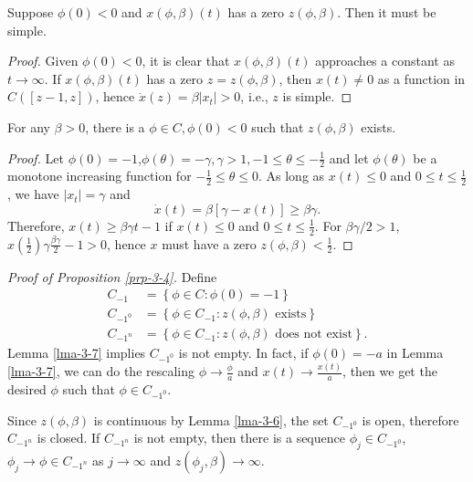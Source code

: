 \begin{lemma}\label{lma-3-6}
  Suppose $\phi(0)<0$ and $x(\phi,\beta)(t)$ has a zero $z(\phi,\beta)$. Then it must be simple.
\end{lemma}
\begin{proof}
  Given $\phi(0)<0$, it is clear that $x(\phi,\beta)(t)$ approaches a constant as $t\to \infty$. If $x(\phi,\beta)(t)$ has a zero $z=z(\phi,\beta)$, then $x(t)\neq 0$ as a function in $C\left( [z-1,z] \right) $, hence $\dot{x}(z)=\beta |x_t|>0$, i.e., $z$ is simple. 
\end{proof}

\begin{lemma}\label{lma-3-7}
  For any $\beta>0$, there is a  $\phi \in C,\phi(0)<0$ such that $z(\phi,\beta)$ exists.
\end{lemma}
\begin{proof}
  Let $\phi(0)=-1$,$ \phi(\theta)=-\gamma,\gamma>1,-1\le \theta \le -\frac{1}{2}$ and let $\phi(\theta)$ be a monotone increasing function for $-\frac{1}{2}\le \theta \le 0$. As long as $x(t)\le 0$ and $0\le t \le \frac{1}{2}$, we have $|x_t|=\gamma$ and 
  \[
    \dot{x}(t)=\beta[\gamma-x(t)]\ge \beta \gamma.
  \] 
  Therefore, $x(t)\ge \beta \gamma t-1$ if $x(t)\le 0$ and $0\le t \le \frac{1}{2}$. For $\beta \gamma /2>1$, $x(\frac{1}{2})\gamma \frac{\beta\gamma}{2}-1>0$, hence $x$ must have a zero $z(\phi,\beta)<\frac{1}{2}$.
\end{proof}
\textit{Proof of Proposition \ref{prp-3-4}. } Define 
\begin{equation*}
  \begin{aligned}
    C_{-1}&=\left\{\phi \in C:\phi(0)=-1\right\} \\
    C_{-1^{0}}&= \left\{\phi \in C_{-1}: z(\phi,\beta) \text{ exists}\right\}  \\
    C_{-1^{n}}&= \left\{\phi \in C_{-1}:z(\phi,\beta) \text{ does not exist}\right\} .
  \end{aligned}
\end{equation*}
Lemma \ref{lma-3-7} implies $C_{-1^{0}}$ is not empty. In fact, if $\phi(0)=-a$ in Lemma \ref{lma-3-7}, we can do the rescaling $\phi\to \frac{\phi}{a}$ and $x(t)\to \frac{x(t)}{a}$, then we get the desired $\phi$ such that $\phi \in  C_{-1^{0}}$.

Since $z(\phi,\beta)$ is continuous by Lemma \ref{lma-3-6}, the set $C_{-1^{0}}$ is open, therefore $C_{-1^{n}}$ is closed. If $C_{-1^{n}}$ is not empty, then there is a sequence $\phi_j \in C_{-1^{0}}$,$\phi_j\to \phi \in C_{-1^{n}}$ as $j\to \infty$ and $z(\phi_j,\beta)\to \infty$.

